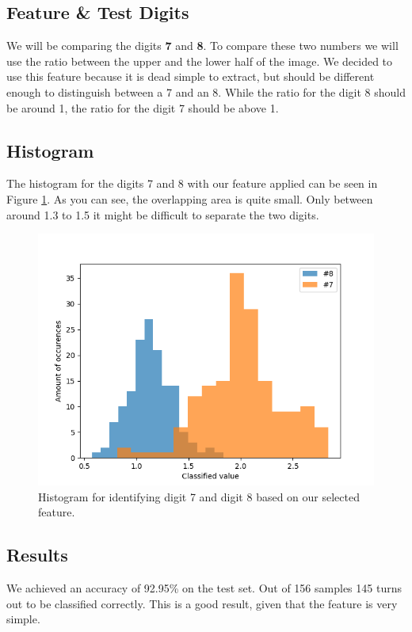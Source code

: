 \documentclass{article}
\begin{document}
\subsection{Feature \& Test Digits}
We will be comparing the digits \textbf{7} and \textbf{8}.
To compare these two numbers we will use the ratio between the upper and the lower half of the image. We decided to use this feature because it is dead simple to extract, but should be different enough to distinguish between a 7 and an 8. While the ratio for the digit 8 should be around 1, the ratio for the digit 7 should be above 1.


\subsection{Histogram}
The histogram for the digits 7 and 8 with our feature applied can be seen in Figure \ref{fig:histogram}.
As you can see, the overlapping area is quite small. Only between around 1.3 to 1.5 it might be difficult to separate the two digits.

\begin{figure}[H]
	\centering
	\includegraphics[width=0.9\linewidth]{img/3/histogram.png}
	\caption{Histogram for identifying digit 7 and digit 8 based on our selected feature.}
	\label{fig:histogram}
\end{figure}

\subsection{Results}
We achieved an accuracy of 92.95\% on the test set. Out of 156 samples 145 turns out to be classified correctly. This is a good result, given that the feature is very simple.
\end{document}
